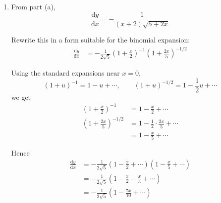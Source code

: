 \documentclass[leqno]{article}
\begin{document}
\begin{enumerate}[
  label=\textbf{\arabic*.},
  leftmargin=*,
  topsep=0pt,
  partopsep=0pt,
  parsep=0pt
]
\begin{tcolorbox}[colback=white, colframe=scarlet, title={\textbf{Solution}}, breakable, grow to left by=6mm, grow to right by=10mm]
\begin{enumerate}[label=\textbf{(\alph*)}]
Now use
\[
\sinh^2 y=\cosh^2 y-1
\]
So
\begin{align*}
\sinh^2 y
&=\left(\frac{x+3}{x+2}\right)^2-1 \\
&=\frac{(x+3)^2-(x+2)^2}{(x+2)^2} \\
&=\frac{x^2+6x+9-(x^2+4x+4)}{(x+2)^2} \\
&=\frac{2x+5}{(x+2)^2}
\end{align*}

Since \(y=\cosh^{-1}(\cdots)\), we have \(y\ge 0\), so \(\sinh y\ge 0\). Also near \(x=0\), \(x+2>0\). Hence
\[
\sinh y=\frac{\sqrt{2x+5}}{x+2}
\]

Substituting into the differentiated equation:
\begin{align*}
\frac{\sqrt{2x+5}}{x+2}\frac{\mathrm{d}y}{\mathrm{d}x}
&=-\frac{1}{(x+2)^2}
\end{align*}
so
\[
\frac{\mathrm{d}y}{\mathrm{d}x}=-\frac{1}{(x+2)\sqrt{2x+5}}
\]

Therefore
\[
(x+2)\sqrt{5+2x}\,\frac{\mathrm{d}y}{\mathrm{d}x}+1=0
\]

So the given result is shown.

  \item From part (a),
\[
\frac{\mathrm{d}y}{\mathrm{d}x}=-\frac{1}{(x+2)\sqrt{5+2x}}
\]

Rewrite this in a form suitable for the binomial expansion:
\begin{align*}
\frac{\mathrm{d}y}{\mathrm{d}x}
&=-\frac{1}{2\sqrt5}\left(1+\frac{x}{2}\right)^{-1}\left(1+\frac{2x}{5}\right)^{-1/2}
\end{align*}

Using the standard expansions near \(x=0\),
\[
(1+u)^{-1}=1-u+\cdots, \qquad (1+u)^{-1/2}=1-\frac12u+\cdots
\]
we get
\begin{align*}
\left(1+\frac{x}{2}\right)^{-1}
&=1-\frac{x}{2}+\cdots \\
\left(1+\frac{2x}{5}\right)^{-1/2}
&=1-\frac{1}{2}\cdot\frac{2x}{5}+\cdots \\
&=1-\frac{x}{5}+\cdots
\end{align*}

Hence
\begin{align*}
\frac{\mathrm{d}y}{\mathrm{d}x}
&=-\frac{1}{2\sqrt5}\left(1-\frac{x}{2}+\cdots\right)\left(1-\frac{x}{5}+\cdots\right) \\
&=-\frac{1}{2\sqrt5}\left(1-\frac{x}{2}-\frac{x}{5}+\cdots\right) \\
&=-\frac{1}{2\sqrt5}\left(1-\frac{7x}{10}+\cdots\right)
\end{align*}


\end{enumerate}
\end{tcolorbox}
\end{enumerate}
\end{document}
